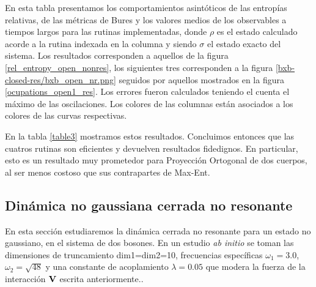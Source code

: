 \documentclass{report} %
\newcommand{\notamm}[1]{{\color{orange} [Comentario MM: #1]}}
\numberwithin{equation}{section}
\begin{document}
\begin{table}
    \begin{tablenotes}
      \small
      \item En esta tabla presentamos los comportamientos asintóticos de las entropías relativas, de las métricas de Bures y los valores medios de los observables a tiempos largos para las rutinas implementadas, donde $\rho$ es el estado calculado acorde a la rutina indexada en la columna y siendo $\sigma$ el estado exacto del sistema. Los resultados corresponden a aquellos de la figura \ref{rel_entropy_open_nonres}, los siguientes tres corresponden a la figura \ref{bxb-closed-res/bxb_open_nr.png} seguidos por aquellos mostrados en la figura \ref{ocupations_open1_res}. Los errores fueron calculados teniendo el cuenta el máximo de las oscilaciones. Los colores de las columnas están asociados a los colores de las curvas respectivas. 
    \end{tablenotes}
    \label{table3}
\end{table}

En la tabla \ref{table3} mostramos estos resultados. Concluimos entonces que las cuatros rutinas son eficientes y devuelven resultados fidedignos. En particular, esto es un resultado muy prometedor para Proyección Ortogonal de dos cuerpos, al ser menos costoso que sus contrapartes de Max-Ent.

\subsection{Dinámica no gaussiana cerrada no resonante}
\label{bxb_cnr}

%

En esta sección estudiaremos la dinámica cerrada no resonante para un estado no gaussiano, en el sistema de dos bosones. En un estudio \textit{ab initio} se toman las dimensiones de truncamiento dim1=dim2=10, frecuencias específicas $\omega_1 = 3.0$, $\omega_2 =\sqrt{48}$ y una constante de acoplamiento $\lambda = 0.05$ que modera la fuerza de la interacción ${\bf V}$ escrita anteriormente.. 
\end{document}

